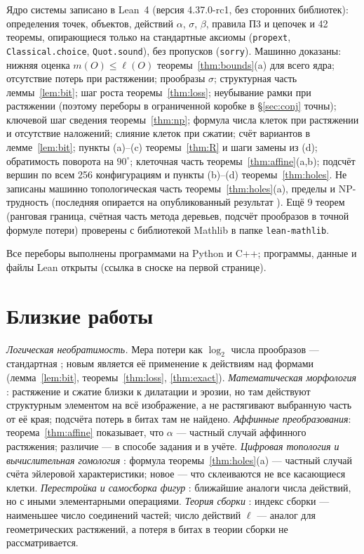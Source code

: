 \documentclass[11pt,a4paper]{article}
\theoremstyle{plain}
\theoremstyle{definition}
\theoremstyle{remark}
\begin{document}
Ядро системы записано в Lean~4 \cite{lean} (версия 4.37.0-rc1, без сторонних библиотек): определения точек, объектов, действий $\alpha$, $\sigma$, $\beta$, правила П3 и цепочек и 42 теоремы, опирающиеся только на стандартные аксиомы (\texttt{propext}, \texttt{Classical.choice}, \texttt{Quot.sound}), без пропусков (\texttt{sorry}). Машинно доказаны: нижняя оценка $m(O)\le\ell(O)$ теоремы~\ref{thm:bounds}(a) для всего ядра; отсутствие потерь при растяжении; прообразы $\sigma$; структурная часть леммы~\ref{lem:bit}; шаг роста теоремы~\ref{thm:loss}; неубывание рамки при растяжении (поэтому переборы в ограниченной коробке в §\ref{sec:conj} точны); ключевой шаг сведения теоремы~\ref{thm:np}; формула числа клеток при растяжении и отсутствие наложений; слияние клеток при сжатии; счёт вариантов в лемме~\ref{lem:bit}; пункты (a)–(c) теоремы~\ref{thm:R} и шаги замены из (d); обратимость поворота на $90^\circ$; клеточная часть теоремы~\ref{thm:affine}(a,b); подсчёт вершин по всем 256 конфигурациям и пункты (b)–(d) теоремы~\ref{thm:holes}. Не записаны машинно топологическая часть теоремы~\ref{thm:holes}(a), пределы и NP-трудность (последняя опирается на опубликованный результат \cite{jiang}). Ещё 9 теорем (ранговая граница, счётная часть метода деревьев, подсчёт прообразов в точной формуле потери) проверены с библиотекой Mathlib в папке \texttt{lean-mathlib}.

Все переборы выполнены программами на Python и C++; программы, данные и файлы Lean открыты (ссылка в сноске на первой странице).

\section{Близкие работы}

\emph{Логическая необратимость.} Мера потери как $\log_2$ числа прообразов — стандартная \cite{landauer,frank}; новым является её применение к действиям над формами (лемма~\ref{lem:bit}, теоремы~\ref{thm:loss}, \ref{thm:exact}).
\emph{Математическая морфология} \cite{serra}: растяжение и сжатие близки к дилатации и эрозии, но там действуют структурным элементом на всё изображение, а не растягивают выбранную часть от её края; подсчёта потерь в битах там не найдено.
\emph{Аффинные преобразования}: теорема~\ref{thm:affine} показывает, что $\alpha$ — частный случай аффинного растяжения; различие — в способе задания и в учёте.
\emph{Цифровая топология и вычислительная гомология} \cite{kong,kaczynski,toriwaki}: формула теоремы~\ref{thm:holes}(a) — частный случай счёта эйлеровой характеристики; новое — что склеиваются не все касающиеся клетки.
\emph{Перестройка и самосборка фигур} \cite{akitaya,soloveichik}: ближайшие аналоги числа действий, но с иными элементарными операциями.
\emph{Теория сборки} \cite{assembly}: индекс сборки — наименьшее число соединений частей; число действий $\ell$ — аналог для геометрических растяжений, а потеря в битах в теории сборки не рассматривается.
\end{document}
